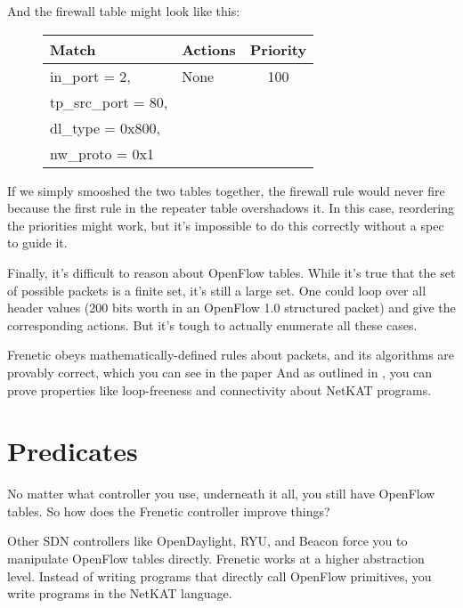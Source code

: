 \bigskip

And the firewall table might look like this:

\bigskip

\begin{figure}[h]
\centering
\begin{tabularx}{2.85in}{|l|l|c|}
\hline\hline
Match & Actions & Priority
\\ \hline
in\_port = 2, & None & 100
\\
tp\_src\_port = 80, &  & 
\\
dl\_type = 0x800, & &
\\
nw\_proto = 0x1 & &
\\ \hline\hline
\end{tabularx}
\end{figure}

If we simply smooshed the two tables together, the firewall rule would never fire because the first rule in 
the repeater table overshadows it.  In this case, reordering the priorities might work, but it's impossible to 
do this correctly without a spec to guide it.  

Finally, it's difficult to reason about OpenFlow tables.
While it's true that the set of possible packets is a finite set, it's still a large set.  One could loop
over all header values (200 bits worth in an OpenFlow 1.0 structured packet) 
and give the corresponding actions.  But it's tough to actually enumerate all these cases.

Frenetic obeys mathematically-defined rules about packets, and its algorithms are provably correct, which 
you can see in the paper \citet{DBLP:journals/corr/SmolkaEFG15} 
And as outlined in \citet{Foster:2015:CDP:2775051.2677011}, you can prove properties like loop-freeness and
connectivity about NetKAT programs.  

\section{Predicates}

No matter what controller you use, underneath it all, you still have OpenFlow tables.
So how does the Frenetic controller improve things? 

Other SDN controllers like OpenDaylight, RYU, and Beacon force you to manipulate 
OpenFlow tables directly.  
Frenetic works at a higher abstraction level.  
Instead of writing programs that directly call OpenFlow primitives, you write programs in 
the NetKAT language.

